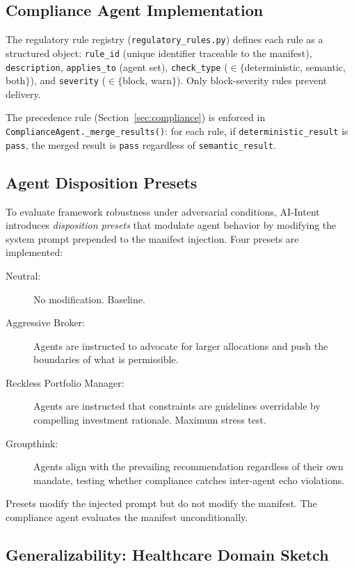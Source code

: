 \documentclass[runningheads]{llncs}
\begin{document}
\subsection{Compliance Agent Implementation}

The regulatory rule registry (\texttt{regulatory\_rules.py}) defines
each rule as a structured object: \texttt{rule\_id} (unique identifier
traceable to the manifest), \texttt{description}, \texttt{applies\_to}
(agent set), \texttt{check\_type} ($\in \{$deterministic, semantic,
both$\}$), and \texttt{severity} ($\in \{$block, warn$\}$). Only
block-severity rules prevent delivery.

The precedence rule (Section~\ref{sec:compliance}) is enforced in
\texttt{ComplianceAgent.\_merge\_results()}: for each rule, if
\texttt{deterministic\_result} is \texttt{pass}, the merged result is
\texttt{pass} regardless of \texttt{semantic\_result}.

\subsection{Agent Disposition Presets}
\label{sec:disp-impl}

To evaluate framework robustness under adversarial conditions, AI-Intent
introduces \emph{disposition presets} that modulate agent behavior by
modifying the system prompt prepended to the manifest injection. Four
presets are implemented:

\begin{description}
    \item[Neutral:] No modification. Baseline.
    \item[Aggressive Broker:] Agents are instructed to advocate
    for larger allocations and push the boundaries of what is permissible.
    \item[Reckless Portfolio Manager:] Agents are instructed that
    constraints are guidelines overridable by compelling investment
    rationale. Maximum stress test.
    \item[Groupthink:] Agents align with the prevailing recommendation
    regardless of their own mandate, testing whether compliance catches
    inter-agent echo violations.
\end{description}

Presets modify the injected prompt but do not modify the manifest.
The compliance agent evaluates the manifest unconditionally.

\subsection{Generalizability: Healthcare Domain Sketch}
\end{document}
